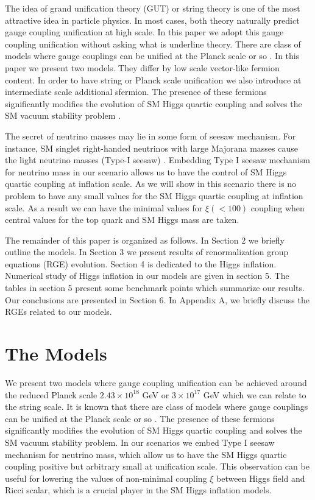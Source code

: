 \documentclass[aps,prd,preprint,superscriptaddress,showpacs,ctexart]{revtex4-1}
\begin{document}
The idea of grand unification theory (GUT) or string theory is one
of the most attractive idea in particle physics. In most cases, both
theory naturally predict gauge coupling unification at high scale.
In this paper we adopt this gauge coupling unification without asking
what is underline theory. There are class of models where gauge
couplings can be unified at the Planck scale or so \cite{Haba:2014oxa}.
In this paper we present two models. They differ  by low
scale vector-like fermion content. In order to have string
or Planck scale unification we also introduce at intermediate scale
additional sfermion. The presence of these fermions significantly
modifies the evolution of SM Higgs quartic coupling and solves the
SM vacuum stability problem \cite{Degrassi:2012ry}.

The secret of neutrino masses may lie in some form of seesaw mechanism.
 For instance, SM singlet right-handed neutrinos with large Majorana masses
cause the light neutrino masses (Type-I seesaw) \cite{Seesaw}. Embedding
Type I seesaw mechanism for neutrino mass in our scenario  allows us
to have the control of SM Higgs quartic coupling at inflation scale.
As we will show in this scenario there is no problem to have any small
values for the SM Higgs quartic coupling at inflation scale. As a
result we can have the minimal values for $\xi(<100)$ coupling when
central values for the top quark and SM Higgs mass are taken.

The remainder of this paper is organized as follows. In Section 2
we briefly outline the models. In Section 3 we present results of
renormalization group equations (RGE) evolution. Section 4 is dedicated
to the Higgs inflation. Numerical study of Higgs inflation in our
models are given in section 5. The tables in section 5 present
some benchmark points which summarize our results. Our conclusions
are presented in Section 6. In Appendix A, we briefly discuss the
RGEs related to our models.


\section{The Models}

We present two models where gauge coupling unification can be achieved
around the reduced Planck scale $2.43\times10^{18}$ GeV or $3\times10^{17}$
GeV which we can relate to the string scale. It is known that there
are class of models where gauge couplings can be unified at the Planck
scale or so \cite{Haba:2014oxa}. The presence of these fermions significantly
modifies the evolution of SM Higgs quartic coupling and solves the
SM vacuum stability problem. In our scenarios we embed Type I seesaw
mechanism for neutrino mass, which allow us to have the SM
Higgs quartic coupling positive but arbitrary small at unification
scale. This observation can be useful for lowering the values of non-minimal
coupling $\xi$ between Higgs field and Ricci scalar, which is a crucial
player in the SM Higgs inflation models.
\end{document}

